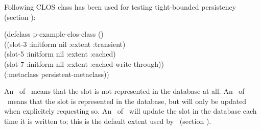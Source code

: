 Following CLOS class has been used for testing tight-bounded
persistency (section ):
\begin{IndentedCompactCode}
(defclass p-example-clos-class ()\\
  ((slot-3 :initform nil :extent :transient)\\
   (slot-5 :initform nil :extent :cached)\\
   (slot-7 :initform nil :extent :cached-write-through))\\
  (:metaclass persistent-metaclass))
\end{IndentedCompactCode}

An \ of \ means that the slot is
not represented in the database at all.  An \ of
\ means that the slot is represented in the database,
but will only be updated when explicitely requesting so.  An
\ of \ will update the
slot in the database each time it is written to; this is the default
extent used by \plob\ (section ).

